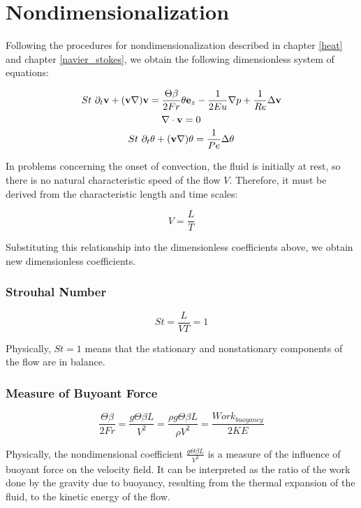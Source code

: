 \section{Nondimensionalization}

Following the procedures for nondimensionalization described in chapter \ref{heat} and chapter \ref{navier_stokes}, we obtain the following dimensionless system of equations:

\begin{equation} \label{NS1-inertNondim_boussinesq_ch4}
St~ \partial_t\mathbf{v} + (\mathbf{v}\nabla)\mathbf{v} = \frac{\Theta\beta}{2Fr} \theta \mathbf{e}_z - \frac{1}{2 Eu}\nabla p + \frac{1}{Re}\Delta\mathbf{v} 
\end{equation}
\begin{equation} \label{NS2-inertNondim_boussinesq_ch4}
\nabla\cdot \mathbf{v} = 0
\end{equation}
\begin{equation} \label{heat_eq_inertNondim_boussinesq_ch4}
 St~ \partial_t\theta + (\mathbf{v}\nabla)\theta = \frac{1}{Pe} \Delta\theta  
\end{equation}

In problems concerning the onset of convection, the fluid is initially at rest, so there is no natural characteristic speed of the flow $V$. Therefore, it must be derived from the characteristic length and time scales:

$$ V = \frac{L}{T} $$

Substituting this relationship into the dimensionless coefficients above, we obtain new dimensionless coefficients.

\subsubsection{Strouhal Number}

$$ St = \frac{L}{VT} = 1 $$

Physically, $St = 1$ means that the stationary and nonstationary components of the flow are in balance.


\subsubsection{Measure of Buyoant Force}

$$ \frac{\Theta\beta}{2Fr} = \frac{g \Theta \beta L}{V^2} = \frac{\rho g\Theta \beta L}{\rho V^2} = \frac{Work_{buoyancy}}{2KE} $$

Physically, the nondimensional coefficient $\frac{g \Theta \beta L}{V^2}$ is a measure of the influence of buoyant force on the velocity field. It can be interpreted as the ratio of the work done by the gravity due to buoyancy, resulting from the thermal expansion of the fluid, to the kinetic energy of the flow.

